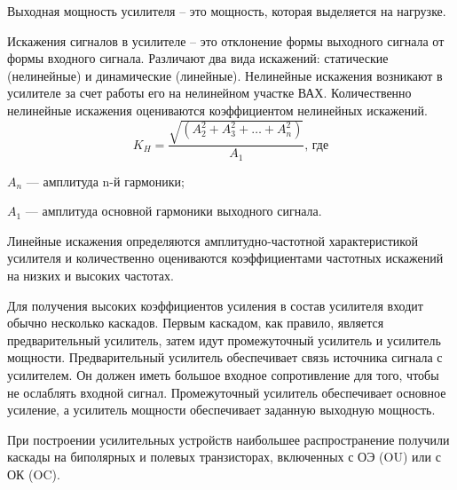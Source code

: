 \documentclass[unicode, 12pt, a4paper, oneside]{article}
\begin{document}
Выходная мощность усилителя – это мощность, которая выделяется на нагрузке.

Искажения сигналов в усилителе – это отклонение формы выходного сигнала от формы входного сигнала. Различают два вида искажений: статические (нелинейные) и динамические (линейные). Нелинейные искажения возникают в усилителе за счет работы его на нелинейном участке ВАХ. Количественно нелинейные искажения оцениваются коэффициентом нелинейных искажений.
\begin{equation}
K_{H} = \dfrac{\sqrt{(A_{2}^{2} + A_{3}^{2} + \ldots + A_{n}^{2})} }{A_{1}}\text{, где}
\end{equation}
\par $A_{n}$ --- амплитуда n-й гармоники;
\par $A_{1}$ --- амплитуда основной гармоники выходного сигнала.

Линейные искажения определяются амплитудно-частотной характеристикой усилителя и количественно оцениваются коэффициентами частотных искажений на низких и высоких частотах.

Для получения высоких коэффициентов усиления в состав усилителя входит обычно несколько каскадов. Первым каскадом, как правило, является предварительный усилитель, затем идут промежуточный усилитель и усилитель мощности. Предварительный усилитель обеспечивает связь источника сигнала с усилителем. Он должен иметь большое входное сопротивление для того, чтобы не ослаблять входной сигнал. Промежуточный усилитель обеспечивает основное усиление, а усилитель мощности обеспечивает заданную выходную мощность.

При построении усилительных устройств наибольшее распространение получили каскады на биполярных и полевых транзисторах, включенных с ОЭ (OU) или с ОК (OC).
\end{document}
